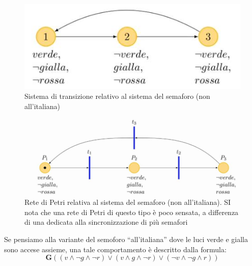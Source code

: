 \documentclass[a4paper,12pt, oneside]{book}
\begin{document}
\begin{figure}[H]
  \centering
  \includegraphics[scale = 0.5]{img/semp.jpg}
  \caption{Sistema di transizione relativo al sistema del semaforo (non
    all'italiana)} 
\end{figure}
\begin{figure}[H]
  \centering
  \includegraphics[scale = 0.45]{img/semp2.jpg}
  \caption{Rete di Petri relativa al sistema del semaforo (non all'italiana). SI
  nota che una rete di Petri di questo tipo è poco sensata, a differenza di una
  dedicata alla sincronizzazione di più semafori}
\end{figure}
Se pensiamo alla variante del semoforo ``all'italiana'' dove le luci verde e
gialla sono accese assieme, una tale comportamento è descritto dalla formula:
\[\mathbf{G}((v\land \neg g\land\neg r)\lor(v\land g\land \neg r)\lor(\neg
  v\land \neg g\land r))\]
\newpage
\end{document}
